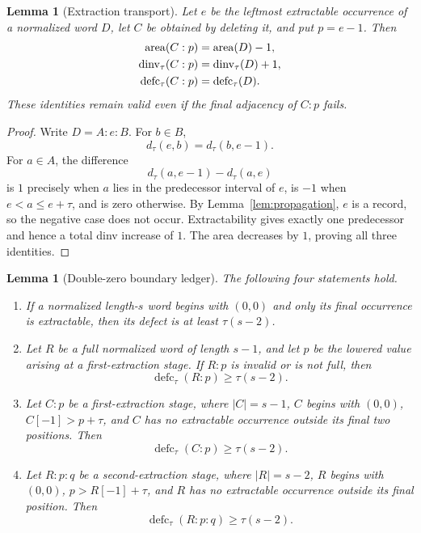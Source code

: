 \documentclass[11pt]{article}
\newtheorem{lemma}[theorem]{Lemma}
\theoremstyle{definition}
\theoremstyle{remark}
\newcommand{\area}{\operatorname{area}}
\newcommand{\dinv}{\operatorname{dinv}}
\newcommand{\defc}{\operatorname{defc}}
\begin{document}
\begin{lemma}[Extraction transport]
\label{lem:transport}
Let $e$ be the leftmost extractable occurrence of a normalized word $D$,
let $C$ be obtained by deleting it, and put $p=e-1$.  Then
\begin{align}
 \area(C:p)&=\area(D)-1,\notag\\
 \dinv_\tau(C:p)&=\dinv_\tau(D)+1,\label{eq:transport}\\
 \defc_\tau(C:p)&=\defc_\tau(D).\notag
\end{align}
These identities remain valid even if the final adjacency of $C:p$ fails.
\end{lemma}

\begin{proof}
Write $D=A:e:B$.  For $b\in B$,
\[
  d_\tau(e,b)=d_\tau(b,e-1).
\]
For $a\in A$, the difference
\[
  d_\tau(a,e-1)-d_\tau(a,e)
\]
is $1$ precisely when $a$ lies in the predecessor interval of $e$, is
$-1$ when $e<a\le e+\tau$, and is zero otherwise.  By
Lemma~\ref{lem:propagation}, $e$ is a record, so the negative case does not
occur.  Extractability gives exactly one predecessor and hence a total dinv
increase of $1$.  The area decreases by $1$, proving all three identities.
\end{proof}

\begin{lemma}[Double-zero boundary ledger]
\label{lem:boundary-ledger}
The following four statements hold.
\begin{enumerate}
\item If a normalized length-$s$ word begins with $(0,0)$ and only its final
occurrence is extractable, then its defect is at least $\tau(s-2)$.
\item Let $R$ be a full normalized word of length $s-1$, and let $p$ be the
lowered value arising at a first-extraction stage.  If $R:p$ is invalid or is
not full, then
\[
  \defc_\tau(R:p)\ge\tau(s-2).
\]
\item Let $C:p$ be a first-extraction stage, where $|C|=s-1$, $C$ begins
with $(0,0)$, $C[-1]>p+\tau$, and $C$ has no extractable occurrence outside
its final two positions.  Then
\[
  \defc_\tau(C:p)\ge\tau(s-2).
\]
\item Let $R:p:q$ be a second-extraction stage, where $|R|=s-2$, $R$ begins
with $(0,0)$, $p>R[-1]+\tau$, and $R$ has no extractable occurrence outside
its final position.  Then
\[
  \defc_\tau(R:p:q)\ge\tau(s-2).
\]
\end{enumerate}
\end{lemma}
\end{document}
